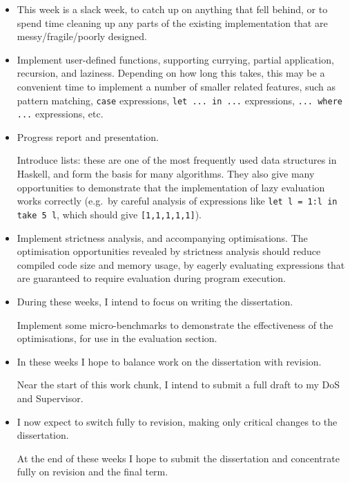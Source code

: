 \documentclass[12pt]{article}
\newcommand\haskell[1]{\texttt{#1}}
\begin{document}
\begin{itemize}
{    After this work is complete, the absolutely minimal success criteria should have been met, taking pressure off the
    rest of the planned work.
}
\item
{

    This week is a slack week, to catch up on anything that fell behind, or to spend time cleaning up any parts of the
    existing implementation that are messy/fragile/poorly designed.
}
\item
{

    Implement user-defined functions, supporting currying, partial application, recursion, and laziness. Depending on
    how long this takes, this may be a convenient time to implement a number of smaller related features, such as
    pattern matching, \haskell{case} expressions, \haskell{let ... in ...} expressions, \haskell{... where ...}
    expressions, etc.
}
\item
{

    Progress report and presentation.

    Introduce lists: these are one of the most frequently used data structures in Haskell, and form the basis for many
    algorithms. They also give many opportunities to demonstrate that the implementation of lazy evaluation works
    correctly (e.g.\ by careful analysis of expressions like \haskell{let l = 1:l in take 5 l}, which should give
    \haskell{[1,1,1,1,1]}).
}
\item
{

    Implement strictness analysis, and accompanying optimisations. The optimisation opportunities revealed by
    strictness analysis should reduce compiled code size and memory usage, by eagerly evaluating expressions that are
    guaranteed to require evaluation during program execution.
}
\item
{

    During these weeks, I intend to focus on writing the dissertation.

    Implement some micro-benchmarks to demonstrate the effectiveness of the optimisations, for use in the evaluation
    section.
}
\item
{

    In these weeks I hope to balance work on the dissertation with revision.
    
    Near the start of this work chunk, I intend to submit a full draft to my DoS and Supervisor.
}
\item
{

    I now expect to switch fully to revision, making only critical changes to the dissertation.

    At the end of these weeks I hope to submit the dissertation and concentrate fully on revision and the final term.
}
\end{itemize}
\end{document}
